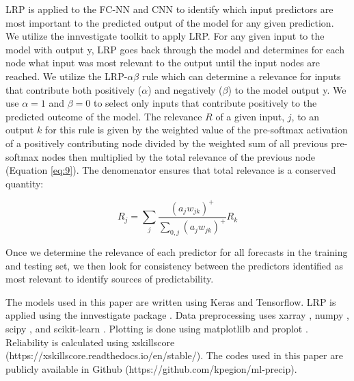 \documentclass{ametsocV6.1}
\begin{document}
\appendix[D] 
\label{DLRP}
LRP is applied to the FC-NN and CNN to identify which input predictors are most important to the predicted output of the model for any given prediction.  We utilize the innvestigate toolkit \citep{alber_innvestigate} to apply LRP.  For any given input to the model with output y,  LRP goes back through the model and determines for each node what input was most relevant to the output until the input nodes are reached.  We utilize the LRP-$\alpha\beta$ rule which can determine a relevance for inputs that contribute both positively ($\alpha$) and negatively ($\beta$) to the model output y.  We use $\alpha=1$ and $\beta=0$ to select only inputs that contribute positively to the predicted outcome of the model. The relevance $R$ of a given input, $j$,  to an output $k$ for this rule is given by the weighted value of the pre-softmax activation of a positively contributing node divided by the weighted sum of all previous pre-softmax nodes then multiplied by the total relevance of the previous node (Equation \ref{eq:9}).  The denomenator ensures that total relevance is a conserved quantity: 

\begin{equation}
\label{eq:9}
R_j=\sum_{j}{\frac{(a_{j}w_{jk})^+}{\sum_{0,j}{(a_{j}w_{jk})^+}}}R_{k}
\end{equation}

Once we determine the relevance of each predictor for all forecasts in the training and testing set, we then look for consistency between the predictors identified as most relevant to identify sources of predictability. 

\appendix[E]
\label{ECODE}
The models used in this paper are written using Keras and Tensorflow. LRP is applied using the innvestigate package \citep{alber_innvestigate}.  Data preprocessing uses xarray \citep{hoyer_xarray_2017,hoyer_xarray_2021}, numpy \citep{harris_array_2020}, scipy \citep{virtanen_scipy_2020}, and scikit-learn \citep{pedregosa_scikit-learn_2011}.  Plotting is done using matplotlilb \citep{hunter_matplotlib_2007} and proplot \citep{davis_proplot_2021}. Reliability is calculated using xskillscore (https://xskillscore.readthedocs.io/en/stable/).  The codes used in this paper are publicly available in Github (https://github.com/kpegion/ml-precip).  



\end{document}
